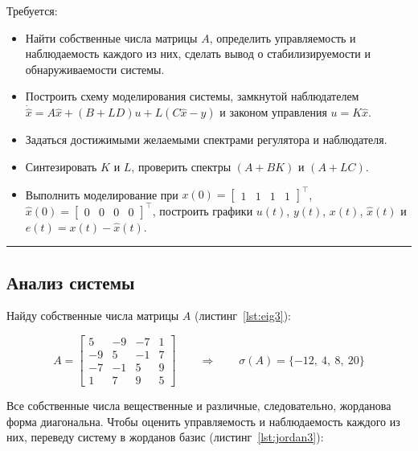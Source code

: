 \documentclass[a4paper,12pt]{article}
\begin{document}
Требуется:

\begin{itemize}
	\item Найти собственные числа матрицы $A$, определить управляемость и наблюдаемость каждого из них, сделать вывод о стабилизируемости и обнаруживаемости системы.
	\item Построить схему моделирования системы, замкнутой наблюдателем $\dot{\hat{x}} = A\hat{x} + (B + LD)u + L(C\hat{x} - y)$ и законом управления $u = K\hat{x}$.
	\item Задаться достижимыми желаемыми спектрами регулятора и наблюдателя.
	\item Синтезировать $K$ и $L$, проверить спектры $(A + BK)$ и $(A + LC)$.
	\item Выполнить моделирование при $x(0) = \begin{bmatrix}1&1&1&1\end{bmatrix}^{\top}$, $\hat{x}(0) = \begin{bmatrix}0&0&0&0\end{bmatrix}^{\top}$, построить графики $u(t)$, $y(t)$, $x(t)$, $\hat{x}(t)$ и $e(t) = x(t) - \hat{x}(t)$.
\end{itemize}

\hrule \newpage

\subsection{Анализ системы}

Найду собственные числа матрицы $A$ (листинг~\ref{lst:eig3}):

\[
A =
\begin{bmatrix}
	5 & -9 & -7 &  1 \\
	-9 &  5 & -1 &  7 \\
	-7 & -1 &  5 &  9 \\
	1 &  7 &  9 &  5
\end{bmatrix}
\qquad \Longrightarrow \qquad
\sigma(A) = \{-12,\ 4,\ 8,\ 20\}
\]

Все собственные числа вещественные и различные, следовательно, жорданова форма диагональна.
Чтобы оценить управляемость и наблюдаемость каждого из них, переведу систему в жорданов базис (листинг~\ref{lst:jordan3}):
\end{document}
